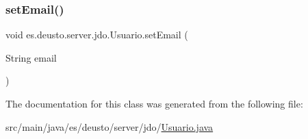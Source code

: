 \mbox{\label{classes_1_1deusto_1_1server_1_1jdo_1_1_usuario_a21f39f8557815c50c81baf11b13c666f}} 
\subsubsection{\texorpdfstring{setEmail()}{setEmail()}}
{\footnotesize\ttfamily void es.\+deusto.\+server.\+jdo.\+Usuario.\+set\+Email (\begin{DoxyParamCaption}\item[{String}]{email }\end{DoxyParamCaption})}



The documentation for this class was generated from the following file\+:\begin{DoxyCompactItemize}
\item 
src/main/java/es/deusto/server/jdo/\mbox{\hyperlink{_usuario_8java}{Usuario.\+java}}\end{DoxyCompactItemize}
